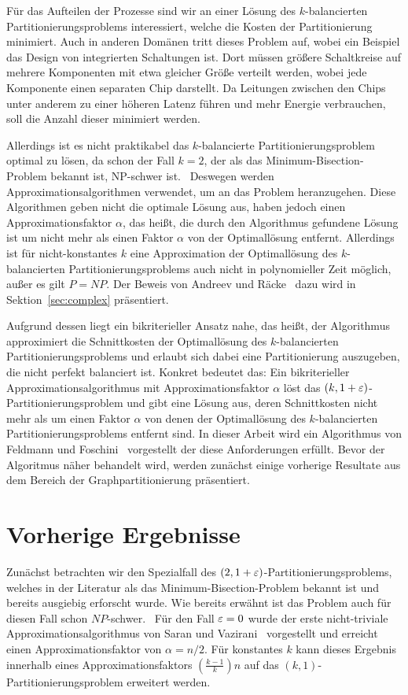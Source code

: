Für das Aufteilen der Prozesse sind wir an einer Lösung des $k$\hyp balancierten Partitionierungsproblems interessiert, welche die Kosten der Partitionierung minimiert.
Auch in anderen Domänen tritt dieses Problem auf, wobei ein Beispiel das Design von integrierten Schaltungen ist.
Dort müssen größere Schaltkreise auf mehrere Komponenten mit etwa gleicher Größe verteilt werden, wobei jede Komponente einen separaten Chip darstellt.
Da Leitungen zwischen den Chips unter anderem zu einer höheren Latenz führen und mehr Energie verbrauchen, soll die Anzahl dieser minimiert werden.

Allerdings ist es nicht praktikabel das $k$\hyp balancierte Partitionierungsproblem optimal zu lösen, da schon der Fall $k=2$, der als das Minimum-Bisection-Problem bekannt ist, NP-schwer ist.~\cite{gj79}
Deswegen werden Approximationsalgorithmen verwendet, um an das Problem heranzugehen.
Diese Algorithmen geben nicht die optimale Lösung aus, haben jedoch einen Approximationsfaktor $\alpha$, das heißt, die durch den Algorithmus gefundene Lösung ist um nicht mehr als einen Faktor $\alpha$ von der Optimallösung entfernt.
Allerdings ist für nicht-konstantes $k$ eine Approximation der Optimallösung des $k$\hyp balancierten Partitionierungsproblems auch nicht in polynomieller Zeit möglich, außer es gilt $P=NP$.
Der Beweis von Andreev und Räcke~\cite{ar06} dazu wird in Sektion~\ref{sec:complex} präsentiert.

Aufgrund dessen liegt ein bikriterieller Ansatz nahe, das heißt, der Algorithmus approximiert die Schnittkosten der Optimallösung des $k$\hyp balancierten Partitionierungsproblems und erlaubt sich dabei eine Partitionierung auszugeben, die nicht perfekt balanciert ist.
Konkret bedeutet das: Ein bikriterieller Approximationsalgorithmus mit Approximationsfaktor $\alpha$ löst das $(k, 1 + \varepsilon)$\hyp Partitionierungsproblem und gibt eine Lösung aus, deren Schnittkosten nicht mehr als um einen Faktor $\alpha$ von denen der Optimallösung des $k$\hyp balancierten Partitionierungsproblems entfernt sind.
In dieser Arbeit wird ein Algorithmus von Feldmann und Foschini~\cite{FF15} vorgestellt der diese Anforderungen erfüllt.
Bevor der Algoritmus näher behandelt wird, werden zunächst einige vorherige Resultate aus dem Bereich der Graphpartitionierung präsentiert.

\section{Vorherige Ergebnisse}
Zunächst betrachten wir den Spezialfall des $(2, 1 + \varepsilon)$\hyp Partitionierungsproblems, welches in der Literatur als das Minimum-Bisection-Problem bekannt ist und bereits ausgiebig erforscht wurde.
Wie bereits erwähnt ist das Problem auch für diesen Fall schon $NP$\hyp schwer.~\cite{gj79}
Für den Fall $\varepsilon = 0$ wurde der erste nicht-triviale Approximationsalgorithmus von Saran und Vazirani~\cite{SV91} vorgestellt und erreicht einen Approximationsfaktor von $\alpha = n/2$.
Für konstantes $k$ kann dieses Ergebnis innerhalb eines Approximationsfaktors $\left(\frac{k-1}{k}\right)n$ auf das $(k, 1)$\hyp Partitionierungsproblem erweitert werden.


